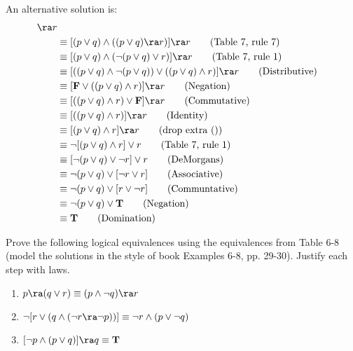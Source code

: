\begin{questions}
\begin{solution}
    An alternative solution is:
    \begin{align*}
      [(p \vee q) &\wedge ((p \ra r) \wedge (q \ra r))] \ra r \\
       &\equiv [(p \vee q) \wedge ((p \vee q) \ra r)] \ra r \tag{Table 7, rule 7} \\
       &\equiv [(p \vee q) \wedge (\neg (p \vee q) \vee r)] \ra r \tag{Table 7, rule 1} \\
       &\equiv [((p \vee q) \wedge \neg (p \vee q)) \vee ((p \vee q) \wedge r)] \ra r \tag{Distributive} \\
       &\equiv [\mathbf{F} \vee ((p \vee q) \wedge r)] \ra r \tag{Negation} \\
       & \equiv [((p \vee q) \wedge r) \vee \mathbf{F}] \ra r \tag{Commutative} \\
       & \equiv [((p \vee q) \wedge r)] \ra r \tag{Identity} \\
       & \equiv [(p \vee q) \wedge r] \ra r \tag{drop extra ()} \\
       & \equiv \neg [(p \vee q) \wedge r] \vee r \tag{Table 7, rule 1} \\
       & \equiv  [\neg (p \vee q) \vee \neg r] \vee r \tag{DeMorgans} \\
       & \equiv  \neg (p \vee q) \vee [\neg r \vee r ] \tag{Associative} \\
       & \equiv \neg (p \vee q) \vee [r \vee \neg r] \tag{Communtative} \\
       & \equiv \neg (p \vee q) \vee \mathbf{T} \tag{Negation} \\
       & \equiv \mathbf{T} \tag{Domination} 
    \end{align*}



    \end{solution}


 Prove the following logical equivalences using the
equivalences from Table 6-8 (model the solutions in the style of
book Examples 6-8, pp. 29-30).  Justify each step with laws.
\begin{enumerate}[label=(\alph*),itemsep=0pt,parsep=0pt,topsep=0pt,partopsep=0pt]
    \item $p \ra (q \vee r) \equiv (p \wedge \neg q) \ra r$
    \item $\neg [ r \vee (q \wedge (\neg r \ra \neg p))] \equiv \neg r \wedge (p \vee \neg q) $
    \item $ [ \neg p \wedge (p \vee q) ] \ra q \equiv \mathbf{T}$
\end{enumerate}
    \begin{solution}
    

\end{solution}
\end{questions}
